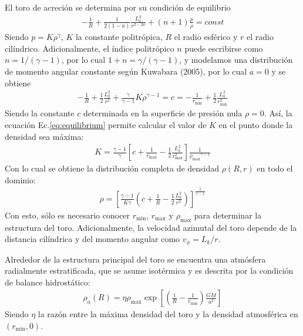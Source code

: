 \documentclass[11pt, letterpaper]{article}
\begin{document}
El toro de acreción se determina por su condición de equilibrio
\begin{align*}
    -\frac{1}{R} + \frac{1}{2(1-a)} \frac{L_k^2}{r^{2-2a}} + (n+1)\frac{p}{\rho} = const
\end{align*}
Siendo $p = K\rho^{\gamma}$, $K$ la constante politrópica, $R$ el radio esférico y $r$ el radio cilíndrico. Adicionalmente, el índice politrópico $n$ puede escribirse como $n = 1 /(\gamma - 1)$, por lo cual $1 + n = \gamma / (\gamma - 1)$, y modelamos una distribución de momento angular constante según Kuwabara (2005)\cite{Kuwabara}, por lo cual $a = 0$ y se obtiene
\begin{align}\label{eq:equilibrium}
    -\frac{1}{R} + \frac{1}{2}\frac{L_k^2}{r^2} + \frac{\gamma}{\gamma-1}K\rho^{\gamma-1} = c = -\frac{1}{r_{\min}} + \frac{1}{2}\frac{L_k^2}{r_{\min}^2}
\end{align}
Siendo la constante $c$ determinada en la superficie de presión nula $\rho = 0$. Así, la ecuación Ec.\ref{eq:equilibrium} permite calcular el valor de $K$ en el punto donde la densidad sea máxima:
\begin{align}\label{eq:K_rhomax}
    K = \frac{\gamma - 1}{\gamma} \left[c + \frac{1}{r_{\max}} - \frac{1}{2}\frac{L_k^2}{r_{\max}^2}\right] \frac{1}{{\rho_{\max}}^{\gamma -1}}
\end{align}
Con lo cual se obtiene la distribución completa de densidad $\rho(R, r)$ en todo el dominio:
\begin{align}\label{eq:rho}
    \rho = \left[ \frac{\gamma - 1}{K\gamma} \left(c+ \frac{1}{R} - \frac{1}{2} \frac{L_k^2}{r^2}\right) \right]^{\frac{1}{\gamma - 1}}
\end{align}
Con esto, sólo es necesario conocer $r_{\min}$, $r_{\max}$ y $\rho_{\max}$ para determinar la estructura del toro. Adicionalmente, la velocidad azimutal del toro depende de la distancia cilíndrica y del momento angular como $v_\phi = L_k / r$.

\medskip

Alrededor de la estructura principal del toro se encuentra una atmósfera radialmente estratificada, que se asume isotérmica y es descrita por la condición de balance hidrostático:
\begin{align}\label{eq:hydrostaticbalance}
    \rho_a(R) = \eta\rho_{\max}\exp\left[\left(\frac{1}{R}-\frac{1}{r_{\min}}\right)\frac{GM}{a^2}\right]    
\end{align}
Siendo $\eta$ la razón entre la máxima densidad del toro y la densidad atmosférica en $(r_{\min} , 0)$.
\end{document}
